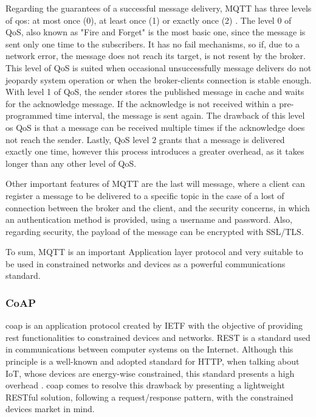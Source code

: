 Regarding the guarantees of a successful message delivery, MQTT has three levels of \acf{qos}: at most once (0), at least once (1) or exactly once (2) \cite{mqtt_qos}. The level 0 of QoS, also known as "Fire and Forget" is the most basic one, since the message is sent only one time to the subscribers. It has no fail mechanisms, so if, due to a network error, the message does not reach its target, is not resent by the broker. This level of QoS is suited when occasional unsuccessfully message delivers do not jeopardy system operation or when the broker-clients connection is stable enough. With level 1 of QoS, the sender stores the published message in cache and waits for the acknowledge message. If the acknowledge is not received within a pre-programmed time interval, the message is sent again. The drawback of this level os QoS is that a message can be received multiple times if the acknowledge does not reach the sender. Lastly, QoS level 2 grants that a message is delivered exactly one time, however this process introduces a greater overhead, as it takes longer than any other level of QoS.

Other important features of MQTT are the last will message, where a client can register a message to be delivered to a specific topic in the case of a lost of connection between the broker and the client, and the security concerns, in which an authentication method is provided, using a username and password. Also, regarding security, the payload of the message can be encrypted with SSL/TLS.

To sum, MQTT is an important Application layer protocol and very suitable to be used in constrained networks and devices as a powerful communications standard.

\subsubsection{CoAP}

\acf{coap} is an application protocol created by IETF with the objective of providing \acf{rest} functionalities to constrained devices and networks. REST is a standard used in communications between computer systems on the Internet. Although this principle is a well-known and adopted standard for HTTP, when talking about IoT, whose devices are energy-wise constrained, this standard presents a high overhead \cite{Salman2013}. \ac{coap} comes to resolve this drawback by presenting a lightweight RESTful solution, following a request/response pattern, with the constrained devices market in mind.

